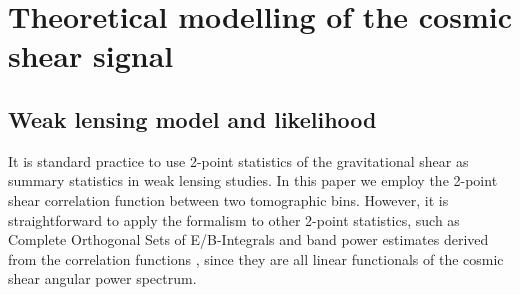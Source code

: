 \documentclass{aa}
\begin{document}
\section{Theoretical modelling of the cosmic shear signal}
\label{sec:likelihood}
\subsection{Weak lensing model and likelihood}
It is standard practice to use 2-point statistics of the gravitational shear as summary statistics in weak lensing studies. In this paper we employ the 2-point shear correlation function between two tomographic bins. However, it is straightforward to apply the formalism to other 2-point statistics, such as Complete Orthogonal Sets of E/B-Integrals \cite[COSEBIs; ][]{schneider10} and band power estimates derived from the correlation functions \citep{schneider02,becker16,vanUitert18}, since they are all linear functionals of the cosmic shear angular power spectrum. 
\end{document}
